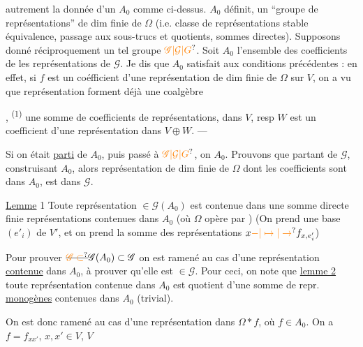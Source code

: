 autrement la donnée
d'un $A_0$ comme ci-dessus. $A_0$ définit, 
un ``groupe de représentations'' de dim finie
de $\Omega$ (i.e. classe de représentations stable
 équivalence, passage aux sous-trucs et
quotients, sommes directes). Supposons
donné réciproquement un tel groupe $\unsure{\mathscr G|\mathcal G|G}$.
Soit $A_0$ l'ensemble des coefficients de
 les représentations de $\mathscr G$.  Je dis
que $A_0$ satisfait aux conditions précédentes :
en effet,  si $f$ est un coéfficient d'une
représentation de dim finie de $\Omega$ sur $V$,
on a vu que 
représentation forment déjà une coalgèbre

, \textsuperscript{(1)} une somme de  coefficients de
représentations, dans $V$, resp $W$ est un
coefficient d'une représentation dans $V\oplus W$. ---

Si on était \uline{parti} de $A_0$, puis passé à $\unsure{\mathscr G|\mathcal G|G}$,
on  $A_0$. Prouvons que partant de
$\mathscr G$, construisant $A_0$, alors  représentation
de dim finie de $\Omega$ dont les coefficients
sont dans $A_0$, est dans $\mathscr G$. 

\uline{Lemme} 1 Toute représentation $\in\mathscr G(A_0)$ est
contenue dans une somme directe finie
représentations contenues dans $A_0$ (où
$\Omega$ opère par ) (On prend
une base $(e'_i)$ de $V'$, et on
prend la somme des représentations $x\unsure{-|\mapsto|\to} f_{x,e'_i}$)

Pour prouver $\deleted{\unsure{\mathscr G\subset}}\mathscr G(A_0)\subset\mathscr G$ on est ramené
au cas d'une représentation \uline{contenue}
dans $A_0$, à prouver qu'elle est $\in\mathscr G$.
Pour ceci, on note que \uline{lemme 2} toute
représentation  contenue dans $A_0$ est quotient
d'une somme  de repr. \uline{monogènes}
contenues dans $A_0$ (trivial).

On est donc ramené au cas d'une
représentation dans $\Omega*f$, où $f\in A_0$.
On a $f=f_{xx'}$, $x,x'\in V$, $V$  

